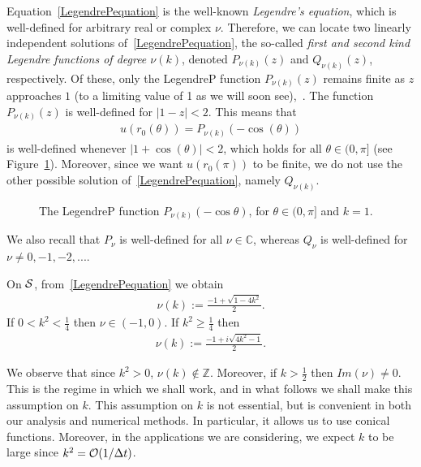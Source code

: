 Equation~\eqref{LegendrePequation} is the well-known {\it Legendre's
equation}, which is well-defined for arbitrary real or complex $\nu$.
Therefore, we can locate two linearly independent solutions
of~\eqref{LegendrePequation}, the so-called {\it first and second kind
Legendre functions of degree $\nu(k)$}, denoted $ P_{\nu(k)}(z)$ and
$Q_{\nu(k)}(z)$, respectively. Of these, only the  LegendreP function
$P_{\nu(k)}(z)$ remains finite as $z$ approaches $1$ (to a limiting
value of 1 as we will soon see),~\cite{lebedev}.  The function
$P_{\nu(k)}(z)$ is well-defined for $|1-z|<2$.  This means that
\begin{align*}
  u(r_0(\theta)) =  P_{\nu(k)}(-\cos(\theta))
\end{align*}
is well-defined whenever $|1+\cos(\theta)|<2$, which holds for all
$\theta \in(0,\pi]$ (see Figure~\ref{f:legendreP}).  Moreover, since we
want $u(r_0(\pi))$ to be finite, we do not use the other possible
solution of~\eqref{LegendrePequation}, namely $Q_{\nu(k)}$.
\begin{figure}[htps]
  \centering
  
  \caption{\label{f:legendreP} The LegendreP function
  $P_{\nu(k)}(-\cos\theta)$, for $\theta \in (0,\pi]$ and $k=1$.}
\end{figure}  
We also recall that $P_{\nu}$ is well-defined for all $\nu \in
\mathbb{C}$, whereas $Q_\nu$ is well-defined for $\nu \not=
0,-1,-2,...$. 

On $\S$, from~\eqref{LegendrePequation} we obtain
\begin{align*}  
  \nu(k):=\frac{-1+\sqrt{1-4k^2}}{2}.
\end{align*}
If $0<k^2<\frac{1}{4}$ then $\nu \in (-1,0)$. If $k^2\geq\frac{1}{4}$ then 
\begin{align*}  
  \nu(k):=\frac{-1+i\sqrt{4k^2-1}}{2}.
\end{align*}

We observe that since $k^{2}>0$, $\nu(k) \notin \mathbb{Z}$. Moreover,
if $k>\frac{1}{2}$ then $Im(\nu)\not=0$.  This is the regime in which we
shall work, and in what follows we shall make this assumption on $k$.
This assumption on $k$ is not essential, but is convenient in both our
analysis and numerical methods.  In particular, it allows us to use
conical functions.  Moreover, in the applications we are considering, we
expect $k$ to be large since $k^{2} = \bigO(1/\Delta t)$.

